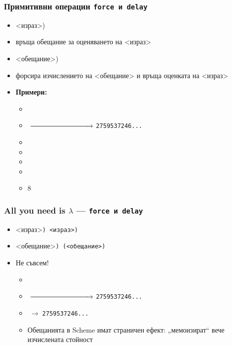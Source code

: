 \documentclass[alsotrans,beameroptions={aspectratio=169}]{beamerswitch}
\begin{document}
\begin{frame}
  \frametitle{Примитивни операции \tt{force} и \tt{delay}}

  \begin{itemize}[<+->]
  \item {} <израз>\tta)
  \item връща \alert{обещание} за оценяването на <израз> 
  \item {} <обещание>\tta)
  \item форсира изчислението на <обещание> и връща оценката на <израз> 
    \pause
  \item \textbf{Примери:}
    \begin{itemize}
    \item {}
    \item {}$\;\xrightarrow{\hspace*{3cm}}\;$\tt{2759537246...}
    \item {}
    \item {}
    \item {}
    \item {}
    \item {}8
    \end{itemize}
  \end{itemize}
\end{frame}

\begin{frame}[fragile]
  \frametitle{All you need is $\lambda$ --- \tt{force} и \tt{delay}}

  \begin{itemize}
  \item {}<израз>\tt) \eqv {}<израз>\tt)
  \item {}<обещание>\tt) \eqv \tt(<обещание>\tt)\pause
  \item \alert{Не съвсем!} \pause
    \begin{itemize}[<.->]
    \item {}
    \item {}$\;\xrightarrow{\hspace*{3cm}}\;$\tt{2759537246...}
    \item {}$\;\rightarrow\;$\tt{2759537246...} \pause
    \item Обещанията в Scheme имат страничен ефект: „мемоизират“ вече изчислената стойност
    \end{itemize}
  \end{itemize}
\end{frame}
\end{document}
